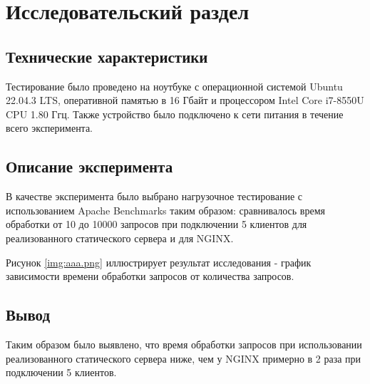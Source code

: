 \chapter{Исследовательский раздел}

\section{Технические характеристики}
Тестирование было проведено на ноутбуке с операционной системой Ubuntu 22.04.3 LTS, оперативной памятью в 16 Гбайт и процессором Intel Core i7-8550U CPU 1.80 Ггц. Также устройство было подключено к сети питания в течение всего эксперимента.

\section{Описание эксперимента}

В качестве эксперимента было выбрано нагрузочное тестирование с использованием Apache Benchmarks таким образом: сравнивалось время обработки от 10 до 10000 запросов при подключении 5 клиентов для реализованного статического сервера и для NGINX. 

Рисунок \ref{img:aaa.png} иллюстрирует результат исследования - график зависимости времени обработки запросов от количества запросов.




\section{Вывод}
Таким образом было выявлено, что время обработки запросов при использовании реализованного статического сервера ниже, чем у NGINX примерно в 2 раза при подключении 5 клиентов.




